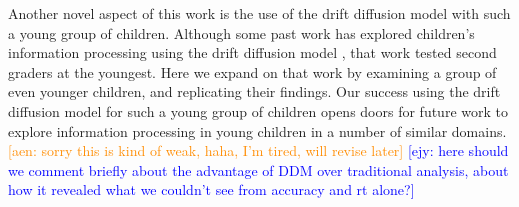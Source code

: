 \documentclass[10pt,letterpaper]{article}
\newcommand{\ejy}[1]{\textcolor{Blue}{[ejy: #1]}}
\newcommand{\aen}[1]{\textcolor{DarkOrange}{[aen: #1]}}
\begin{document}
Another novel aspect of this work is the use of the drift diffusion model with such a young group of children.  Although some past work has explored children's information processing using the drift diffusion model \cite{ratcliff2012}, that work tested second graders at the youngest.  Here we expand on that work by examining a group of even younger children, and replicating their findings.  Our success using the drift diffusion model for such a young group of children opens doors for future work to explore information processing in young children in a number of similar domains.  \aen{sorry this is kind of weak, haha, I'm tired, will revise later} \ejy{here should we comment briefly about the advantage of DDM over traditional analysis, about how it revealed what we couldn't see from accuracy and rt alone?}

%



\setlength{\bibleftmargin}{.125in}
\setlength{\bibindent}{-\bibleftmargin}


\end{document}
